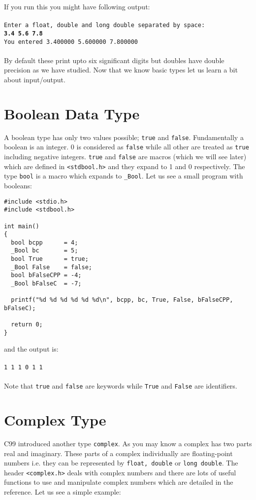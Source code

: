 If you run this you might have following output:
\\\\\texttt{Enter a float, double and long double separated by space:\\
\textbf{3.4 5.6 7.8}\\
You entered 3.400000 5.600000 7.800000\\\\}
By default these print upto six significant digits but doubles have double
precision as we have studied. Now that we know basic types let us learn a bit
about input/output.

\section{Boolean Data Type}
A boolean type has only two values possible; \texttt{true} and
\texttt{false}. Fundamentally a boolean is an integer. 0 is considered as
\texttt{false} while all other are treated as \texttt{true} including negative
integers. \texttt{true} and \texttt{false} are macros (which we will see later)
which are defined in \texttt{<stdbool.h>} and they expand to 1 and 0
respectively. The type \texttt{bool} is a macro which expands to
\texttt{\_Bool}. Let us see a small program with booleans:

\begin{verbatim}
#include <stdio.h>
#include <stdbool.h>

int main()
{
  bool bcpp      = 4;
  _Bool bc       = 5;
  bool True      = true;
  _Bool False    = false;
  bool bFalseCPP = -4;
  _Bool bFalseC  = -7;

  printf("%d %d %d %d %d %d\n", bcpp, bc, True, False, bFalseCPP, bFalseC);

  return 0;
}
\end{verbatim}

and the output is:
\\\\\texttt{1 1 1 0 1 1\\\\}
Note that \texttt{true} and \texttt{false} are keywords while \texttt{True} and
\texttt{False} are identifiers.

\section{Complex Type}
C99 introduced another type \texttt{complex}. As you may know a complex has two
parts real and imaginary. These parts of a complex individually are
floating-point numbers i.e. they can be represented by \texttt{float, double}
or \texttt{long double}. The header \texttt{<complex.h>} deals with complex
numbers and there are lots of useful functions to use and manipulate complex
numbers which are detailed in the reference. Let us see a simple example:

